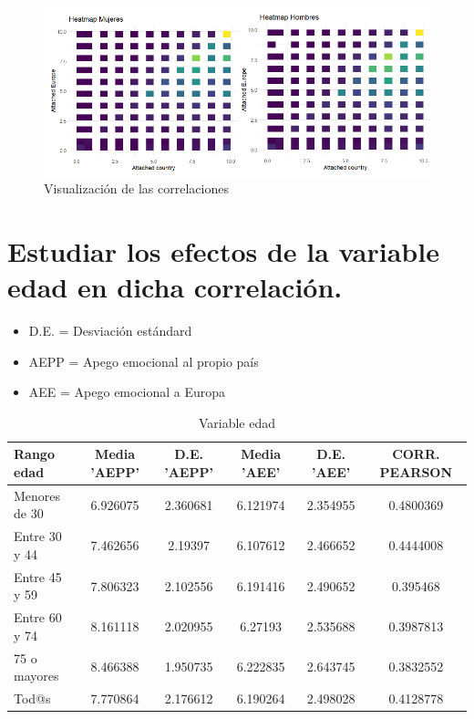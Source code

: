 \documentclass{article}
\begin{document}
 \begin{figure}[H]
 \centering
 \includegraphics[width=1\textwidth]{Imatge1.png}
 \caption{Visualización de las correlaciones}
 \end{figure}

\section{Estudiar los efectos de la variable edad en dicha correlación.}
 \begin{itemize}
 \item D.E. = Desviación estándard
 \item AEPP = Apego emocional al propio país
 \item AEE = Apego emocional a Europa
 \end{itemize}
 \begin{table}[h!]
 \caption{Variable edad}
 \begin{tabular}{l | c c c c c}
 \hline
 \bf{Rango edad} & \bf{Media 'AEPP'} & \bf{D.E. 'AEPP'} & \bf{Media 'AEE'} & \bf{D.E. 'AEE'} & \bf{CORR. PEARSON} \\
 \hline
 Menores de 30 & 6.926075 & 2.360681 & 6.121974 & 2.354955 & 0.4800369 \\
 Entre 30 y 44 & 7.462656 & 2.19397 & 6.107612 & 2.466652 & 0.4444008 \\
 Entre 45 y 59 & 7.806323 & 2.102556 & 6.191416 & 2.490652 & 0.395468 \\
 Entre 60 y 74 & 8.161118 & 2.020955 & 6.27193 & 2.535688 & 0.3987813 \\
 75 o mayores & 8.466388 & 1.950735 & 6.222835 & 2.643745 & 0.3832552 \\
 Tod@s & 7.770864 & 2.176612 & 6.190264 & 2.498028 & 0.4128778 \\
 \hline
 \end{tabular}
 \end{table}
 
\end{document}
